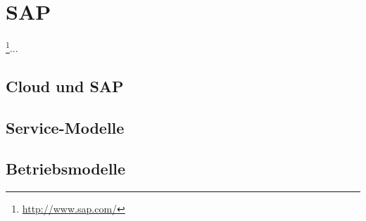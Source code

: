 \section{SAP}
\label{sec_sap}

\footnote{\url{http://www.sap.com/}}... 

\subsection{Cloud und SAP}
\label{sec_sap_general}



\subsection{Service-Modelle}
\label{sec_sap_delivery}



\subsection{Betriebsmodelle}
\label{sec_sap_deployment}

